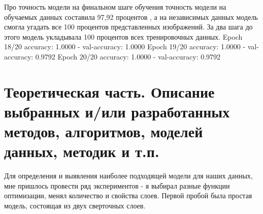 Про точность модели 
на финальном шаге обучения точность модели на обучаемых данных составила 97,92 процентов , а на независимых данных модель смогла угадать все 100 процентов представленных изображений. 
За два шага до этого модель укладывала 100 процентов всех тренировочных данных. \newline
Epoch 18/20 \newline
accuracy: 1.0000 - val-accuracy: 1.0000 \newline
Epoch 19/20\newline
accuracy: 1.0000 - val-accuracy: 0.9792\newline
Epoch 20/20\newline
accuracy: 1.0000 - val-accuracy: 0.9792\newline
\begin{figure}[H]
\end{figure}
\section*{Теоретическая часть. Описание выбранных и/или разработанных методов, алгоритмов, моделей данных, методик и т.п.}
Для определения и выявления наиболее подходящей модели для наших данных, мне пришлось провести ряд экспериментов - я выбирал разные функции оптимизации, менял количество и свойства слоев. 
Первой пробой была простая модель, состоящая из двух сверточных слоев.

